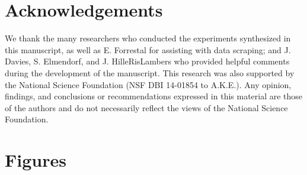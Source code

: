 \documentclass{article}
\begin{document}



\section*{Acknowledgements}
We thank the many researchers who conducted the experiments synthesized in this manuscript, as well as E. Forrestal for assisting with data scraping; and J. Davies, S. Elmendorf, and J. HilleRisLambers who provided helpful comments during the development of the manuscript.%
This research was also supported by the National Science Foundation (NSF DBI 14-01854 to A.K.E.). Any opinion, findings, and conclusions or recommendations expressed in this material are those of the authors and do not necessarily reflect the views of the National Science Foundation.

\section* {Figures}
\end{document}
